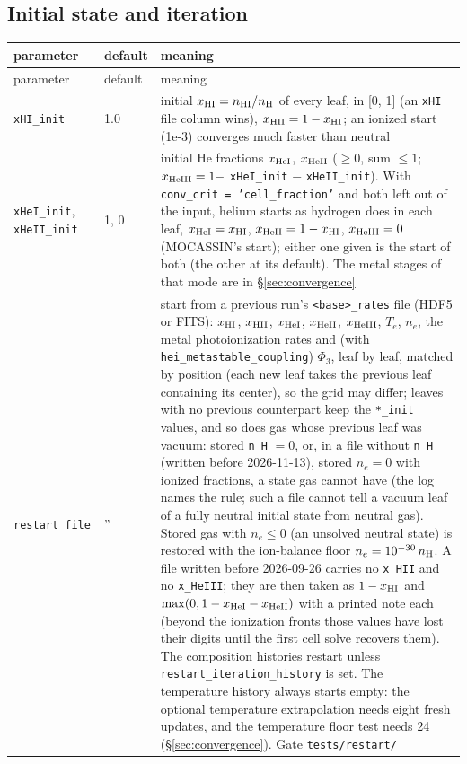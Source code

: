 \documentclass[english,a4paper]{my_memo}
\newcommand{\code}[1]{\texttt{#1}}
\begin{document}
\subsection{Initial state and iteration}
{\small
\begin{longtable}{llp{7.2cm}}
\toprule
parameter & default & meaning \\
\midrule
\endfirsthead
\toprule
parameter & default & meaning \\
\midrule
\endhead
\bottomrule
\endlastfoot
\code{xHI\_init} & 1.0 & initial $x_{\rm HI} = n_{\rm HI}/n_{\rm H}$ of every leaf, in [0, 1] (an \code{xHI} file column wins), $x_{\rm HII} = 1 - x_{\rm HI}$; an ionized start (1e-3) converges much faster than neutral \\
\code{xHeI\_init}, \code{xHeII\_init} & 1, 0 & initial He fractions $x_{\rm HeI}$, $x_{\rm HeII}$ ($\ge 0$, sum $\le 1$; $x_{\rm HeIII} = 1 - $ \code{xHeI\_init} $-$ \code{xHeII\_init}).  With \code{conv\_crit = 'cell\_fraction'} and both left out of the input, helium starts as hydrogen does in each leaf, $x_{\rm HeI} = x_{\rm HI}$, $x_{\rm HeII} = 1 - x_{\rm HI}$, $x_{\rm HeIII} = 0$ (MOCASSIN's start); either one given is the start of both (the other at its default).  The metal stages of that mode are in \S\ref{sec:convergence} \\
\code{restart\_file} & '' & start from a previous run's \code{<base>\_rates} file (HDF5 or FITS): $x_{\rm HI}$, $x_{\rm HII}$, $x_{\rm HeI}$, $x_{\rm HeII}$, $x_{\rm HeIII}$, $T_e$, $n_e$, the metal photoionization rates and (with \code{hei\_metastable\_coupling}) $\Phi_3$, leaf by leaf, matched by position (each new leaf takes the previous leaf containing its center), so the grid may differ; leaves with no previous counterpart keep the \code{*\_init} values, and so does gas whose previous leaf was vacuum: stored \code{n\_H} $= 0$, or, in a file without \code{n\_H} (written before 2026-11-13), stored $n_e = 0$ with ionized fractions, a state gas cannot have (the log names the rule; such a file cannot tell a vacuum leaf of a fully neutral initial state from neutral gas).  Stored gas with $n_e \le 0$ (an unsolved neutral state) is restored with the ion-balance floor $n_e = 10^{-30}\,n_{\rm H}$.  A file written before 2026-09-26 carries no \code{x\_HII} and no \code{x\_HeIII}; they are then taken as $1 - x_{\rm HI}$ and $\max(0, 1 - x_{\rm HeI} - x_{\rm HeII})$ with a printed note each (beyond the ionization fronts those values have lost their digits until the first cell solve recovers them).  The composition histories restart unless \code{restart\_iteration\_history} is set.  The temperature history always starts empty: the optional temperature extrapolation needs eight fresh updates, and the temperature floor test needs 24 (\S\ref{sec:convergence}).  Gate \code{tests/restart/} \\

\end{longtable}}
\end{document}
